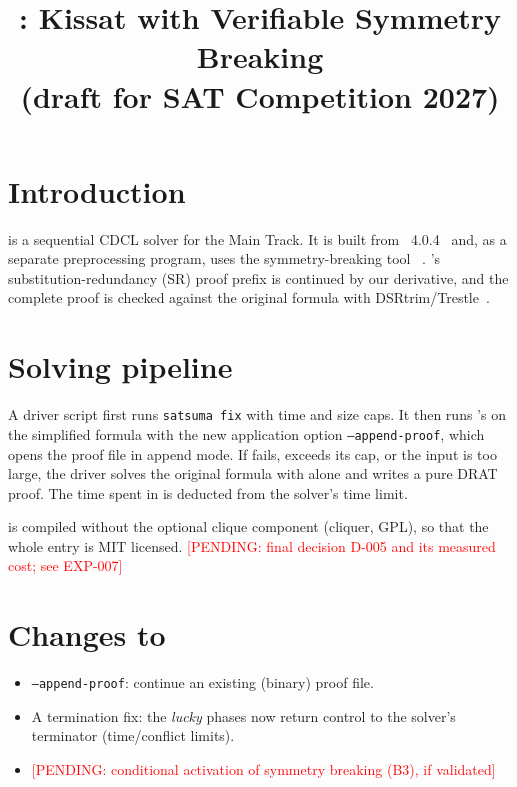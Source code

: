 \documentclass[conference]{IEEEtran}
\newcommand{\pendiente}[1]{\textcolor{red}{[PENDING: #1]}}
\begin{document}
\title{\labesat{}: Kissat with Verifiable Symmetry Breaking\\
       \large (draft for SAT Competition 2027)}

\author{
\IEEEauthorblockA{\pendiente{affiliation}}}

\maketitle

\section{Introduction}

\labesat{} is a sequential CDCL solver for the Main Track. It is built from
\kissat{}~4.0.4~\cite{kissat} and, as a separate preprocessing program, uses
the symmetry-breaking tool \satsuma{}~\cite{satsuma}. \satsuma{}'s
substitution-redundancy (SR) proof prefix is continued by our \kissat{}
derivative, and the complete proof is checked against the original formula
with DSRtrim/Trestle~\cite{dsrtrim}.

\section{Solving pipeline}

A driver script first runs \texttt{satsuma fix} with time and size caps. It
then runs \labesat{}'s \kissat{} on the simplified formula with the new
application option \texttt{--append-proof}, which opens the proof file in
append mode. If \satsuma{} fails, exceeds its cap, or the input is too large,
the driver solves the original formula with \kissat{} alone and writes a pure
DRAT proof. The time spent in \satsuma{} is deducted from the solver's time
limit.

\satsuma{} is compiled without the optional clique component (cliquer, GPL),
so that the whole entry is MIT licensed. \pendiente{final decision D-005 and
its measured cost; see EXP-007}

\section{Changes to \kissat{}}

\begin{itemize}
  \item \texttt{--append-proof}: continue an existing (binary) proof file.
  \item A termination fix: the \emph{lucky} phases now return control to the
        solver's terminator (time/conflict limits).
  \item \pendiente{conditional activation of symmetry breaking (B3), if
        validated}
\end{itemize}
\end{document}
